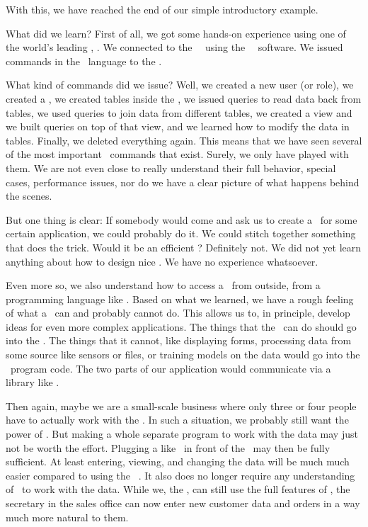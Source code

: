 %
%
%
With this, we have reached the end of our simple introductory example.

What did we learn?
First of all, we got some hands-on experience using one of the world's leading \dbms, \postgresql.
We connected to the \postgresql\ \server\ using the \psql\ \client\ software.
We issued commands in the \sql\ language to the \dbms.

What kind of commands did we issue?
Well, we created a new user (or role), we created a \db, we created tables inside the \db, we issued queries to read data back from tables, we used queries to join data from different tables, we created a view and we built queries on top of that view, and we learned how to modify the data in tables.
Finally, we deleted everything again.
This means that we have seen several of the most important \sql\ commands that exist.
Surely, we only have played with them.
We are not even close to really understand their full behavior, special cases, performance issues, nor do we have a clear picture of what happens behind the scenes.

But one thing is clear:
If somebody would come and ask us to create a \db\ for some certain application, we could probably do it.
We could stitch together something that does the trick.
Would it be an efficient \db?
Definitely not.
We did not yet learn anything about how to design nice .
We have no experience whatsoever.

Even more so, we also understand how to access a \db\ from outside, from a programming language like \python.
Based on what we learned, we have a rough feeling of what a \dbms\ can and probably cannot do.
This allows us to, in principle, develop ideas for even more complex applications.
The things that the \dbms\ can do should go into the \db.
The things that it cannot, like displaying forms, processing data from some source like sensors or files, or training  models on the data would go into the \python\ program code.
The two parts of our application would communicate via a library like \psycopg.

Then again, maybe we are a small-scale business where only three or four people have to actually work with the \db.
In such a situation, we probably still want the power of \postgresql.
But making a whole separate program to work with the data may just not be worth the effort.
Plugging a  like \libreofficeBase\ in front of the \db\ may then be fully sufficient.
At least entering, viewing, and changing the data will be much much easier compared to using the \psql\ \client.
It also does no longer require any understanding of \sql\ to work with the data.
While we, the , can still use the full features of \postgresql, the secretary in the sales office can now enter new customer data and orders in a way much more natural to them.

